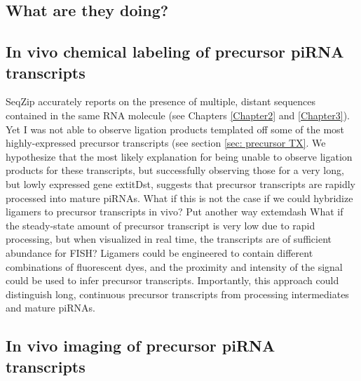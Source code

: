 
  \subsection{What are they doing?}


  \subsection{In vivo chemical labeling of precursor piRNA transcripts}


    
    SeqZip accurately reports on the presence of multiple, distant sequences contained in the same RNA molecule (see Chapters \ref{Chapter2} and \ref{Chapter3}). Yet I was not able to observe ligation products templated off some of the most highly-expressed precursor transcripts (see section \ref{sec: precursor TX}. We hypothesize that the most likely explanation for being unable to observe ligation products for these transcripts, but successfully observing those for a very long, but lowly expressed gene   extit{Dst}, suggests that precursor transcripts are rapidly processed into mature piRNAs. What if this is not the case if we could hybridize ligamers to precursor transcripts in vivo? Put another way  extemdash What if the steady-state amount of precursor transcript is very low due to rapid processing, but when visualized in real time, the transcripts are of sufficient abundance for FISH? Ligamers could be engineered to contain different combinations of fluorescent dyes, and the proximity and intensity of the signal could be used to infer precursor transcripts. Importantly, this approach could distinguish long, continuous precursor transcripts from processing intermediates and mature piRNAs.

  \subsection{In vivo imaging of precursor piRNA transcripts}

